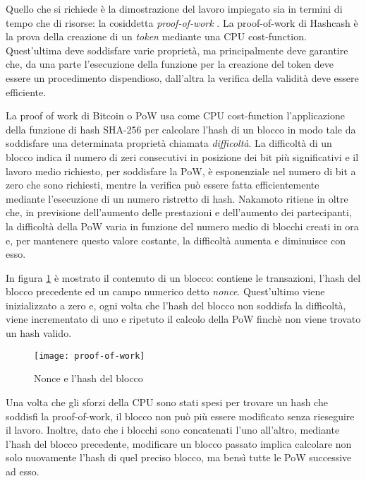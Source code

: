 	Quello che si richiede è la dimostrazione del lavoro impiegato sia in termini di tempo che di risorse: la cosiddetta \textit{proof-of-work} \cite{liu2006proof}. 
	La proof-of-work di Hashcash è la prova della creazione di un \textit{token} mediante una CPU cost-function. Quest'ultima deve soddisfare varie proprietà, ma principalmente deve garantire che, da una parte l'esecuzione della funzione per la creazione del token deve essere un procedimento dispendioso, dall'altra la verifica della validità deve essere efficiente. 
	
	La proof of work di Bitcoin o PoW usa come CPU cost-function l'applicazione della funzione di hash SHA-256 per calcolare l'hash di un blocco in modo tale da soddisfare una determinata proprietà chiamata \textit{difficoltà}. 
	La difficoltà di un blocco indica il numero di zeri consecutivi in posizione dei bit più significativi e il lavoro medio richiesto, per soddisfare la PoW, è esponenziale nel numero di bit a zero che sono richiesti, mentre la verifica può essere fatta efficientemente mediante l’esecuzione di un numero ristretto di hash.
	Nakamoto ritiene in oltre che, in previsione dell'aumento delle prestazioni e dell'aumento dei partecipanti, la difficoltà della PoW varia in funzione del numero medio di blocchi creati in ora e, per mantenere questo valore costante, la difficoltà aumenta e diminuisce con esso.
	
	In figura \ref{fig:proof-of-work} è mostrato il contenuto di un blocco: contiene le transazioni, l'hash del blocco precedente ed un campo numerico detto \textit{nonce}. Quest'ultimo viene inizializzato a zero e, ogni volta che l'hash del blocco non soddisfa la difficoltà, viene incrementato di uno e ripetuto il calcolo della PoW finchè non viene trovato un hash valido. 
	
		\begin{figure}
			\caption{Nonce e l'hash del blocco}
			\centering
			\texttt{[image: proof-of-work]}
			\label{fig:proof-of-work}
		\end{figure}
		
	
	Una volta che gli sforzi della CPU sono stati spesi per trovare un hash che soddisfi la proof-of-work, il blocco non può più essere modificato senza rieseguire il lavoro. Inoltre, dato che i blocchi sono concatenati l'uno all'altro, mediante l'hash del blocco precedente, modificare un blocco passato implica calcolare non solo nuovamente l'hash di quel preciso blocco, ma bensì tutte le PoW successive ad esso.
	
